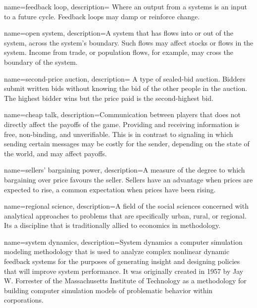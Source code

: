 {
name=feedback loop,
description={%
Where an output from a systems is an input to a future cycle. Feedback loops may damp or reinforce change.}
}

{
name=open system,
description={A %
system that has flows into or out of the system, across the system's boundary. %
Such flows may affect stocks or flows in the system. Income from trade, or population flows, for example, may cross the boundary of the system.}
}

{
name=second-price auction,
description={%
A type of sealed-bid auction. Bidders submit written bids without knowing the bid of the other people in the auction. The highest bidder wins but the price paid is the second-highest bid.}
}

{
name=cheap talk,
description={Communication between players that does not directly affect the payoffs of the game. Providing and receiving information is free, non-binding, and unverifiable. This is in contrast to signaling in which sending certain messages may be costly for the sender, depending on the state of the world, and may affect payoffs.}
}

{
name=sellers' bargaining power,
description={A measure of the degree to which bargaining over price favours the seller. Sellers have an advantage when prices are expected to rise, a common expectation when prices have been rising.}
}

{
name=regional science,
description={A field of the social sciences concerned with analytical approaches to problems that are specifically urban, rural, or regional. Its a discipline that is traditionally allied to economics in methodology.}
}

{
name=system dynamics,
description={System dynamics a computer simulation modeling methodology that is used to analyze complex nonlinear dynamic feedback systems for the purposes of generating insight and designing policies that will improve system performance. It was originally created in 1957 by Jay W. Forrester of the Massachusetts Institute of Technology as a methodology for building computer simulation models of problematic behavior within corporations.}
}

